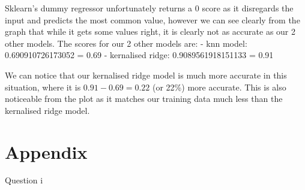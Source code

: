 \documentclass[10pt]{article}
\begin{document}
Sklearn's dummy regressor unfortunately returns a 0 score as it disregards the input and predicts the most common value,
however we can see clearly from the graph that while it gets some values right, it is clearly not as accurate as our 2 other models.
The scores for our 2 other models are:
- knn model:  0.690910726173052 = 0.69
- kernalised ridge:  0.9089561918151133 = 0.91

We can notice that our kernalised ridge model is much more accurate in this situation, where it is $0.91 - 0.69 = 0.22$ (or 22\%) more
accurate. This is also noticeable from the plot as it matches our training data much less than the kernalised ridge model.


\section*{Appendix}
Question i
\end{document}
